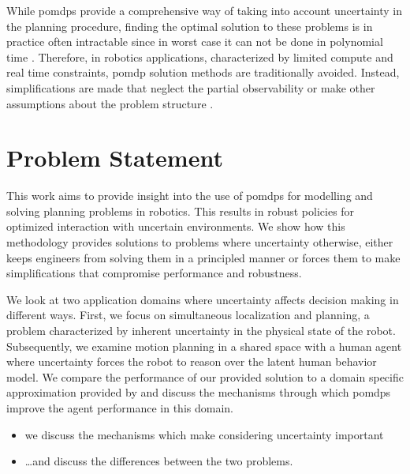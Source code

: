 While \acp{pomdp} provide a comprehensive way of taking into account
uncertainty in the planning procedure, finding the optimal solution to these
problems is in practice often intractable since in worst case it can not be
done in polynomial time \cite{papadimitriou1987complexity}. Therefore, in
robotics applications, characterized by limited compute and real time
constraints, \ac{pomdp} solution methods are traditionally avoided. Instead,
simplifications are made that neglect the partial observability or make other
assumptions about the problem structure \cite{sadigh2016information,
fisac2018probabilistically}.

\section{Problem Statement}


This work aims to provide insight into the use of \acp{pomdp} for modelling and
solving planning problems in robotics. This results in robust policies for
optimized interaction with uncertain environments. We show how this methodology
provides solutions to problems where uncertainty otherwise, either keeps
engineers from solving them in a principled manner or forces them to make
simplifications that compromise performance and robustness.

We look at two application domains where uncertainty affects decision making in
different ways. First, we focus on simultaneous localization and planning,
a problem characterized by inherent uncertainty in the physical state of the
robot. Subsequently, we examine motion planning in a shared space with a human
agent where uncertainty forces the robot to reason over the latent human
behavior model. We compare the performance of our provided solution to a domain
specific approximation provided by \cite{fisac2018probabilistically} and
discuss the mechanisms through which \acp{pomdp} improve the agent performance
in this domain.

\begin{itemize}
  \item we discuss the mechanisms which make considering uncertainty important
  \item \dots and discuss the differences between the two problems.
\end{itemize}

